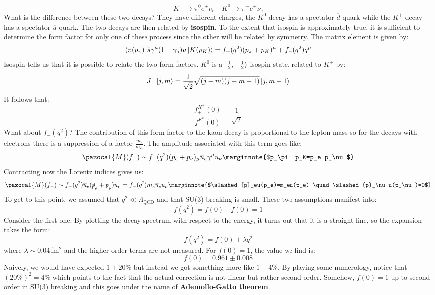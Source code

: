 \documentclass[../main.tex]{subfiles}
\begin{document}
\[
K^+\to\pi^0e^+\nu_e \quad K^0\to\pi^-e^+\nu_e
\]
What is the difference between these two decays? They have different charges, the $K^0$ decay has a spectator $\overline{d}$ quark while the $K^+$ decay has a spectator $\overline{u}$ quark. The two decays are then related by \textbf{isospin}. To the extent that isospin is approximately true, it is sufficient to determine the form factor for only one of these process since the other will be related by symmetry. The matrix element is given by:
\[
\bra{\pi(p_\pi)}\overline{s}\gamma^\mu(1-\gamma_5)u\ket{K(p_K)}=f_+(q^2)(p_\pi+p_K)^\mu+f_-(q^2)q^\mu
\]
Isospin tells us that it is possible to relate the two form factors. $K^0$ is a $\ket{\frac{1}{2},-\frac{1}{2}}$ isospin state, related to $K^+$ by:
\[
J_-\ket{j,m}=\frac{1}{\sqrt{2}}\sqrt{(j+m)(j-m+1)}\ket{j,m-1}
\]
It follows that:
\[
\frac{f_+^{K^+}(0)}{f_+^{K^0}(0)}=\frac{1}{\sqrt{2}}
\]
What about $f_-(q^2)$? The contribution of this form factor to the kaon decay is proportional to the lepton mass so for the decays with electrons there is a suppression of a factor $\frac{m_e}{m_K}$. The amplitude associated with this term goes like:
\[
\pazocal{M}(f_-)\sim f_-(q^2)(p_e+p_\nu)_\mu\overline{u}_e\gamma^\mu u_\nu\marginnote{$p_\pi-p_K=p_e-p_\nu$}
\]
Contracting now the Lorentz indices gives us:
\[
\pazocal{M}(f_-)\sim f_-(q^2)\overline{u}_e(\slashed{p}_e+\slashed{p}_\nu)u_\nu=f_-(q^2)m_e\overline{u}_eu_\nu\marginnote{$\slashed{p}_eu(p_e)=m_eu(p_e) \quad \slashed{p}_\nu u(p_\nu)=0$}
\]
To get to this point, we assumed that $q^2\ll\Lambda_{\text{QCD}}$ and that SU(3) breaking is small. These two assumptions manifest into:
\[
f(q^2)=f(0) \quad f(0)=1
\]
Consider the first one. By plotting the decay spectrum with respect to the energy, it turns out that it is a straight line, so the expansion takes the form:
\[
f(q^2)=f(0)+\lambda q^2
\]
where $\lambda\sim0.04$\,fm$^2$ and the higher order terms are not measured.  For $f(0)=1$, the value we find is:
\[
f(0)=0.961\pm0.008
\]
Naively, we would have expected $1\pm20\%$ but instead we got something more like $1\pm4\%$. By playing some numerology, notice that $(20\%)^2=4\%$ which points to the fact that the actual correction is not linear but rather second-order. Somehow, $f(0)=1$ up to second order in SU(3) breaking and this goes under the name of \textbf{Ademollo-Gatto theorem}.\\
\end{document}

